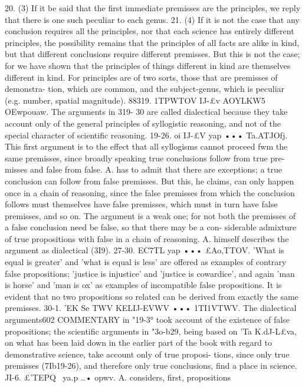 20. (3) If it be said that the first immediate premisses are
the principles, we reply that there is one such peculiar to each
genus.
21. (4) If it is not the case that any conclusion requires all the
principles, nor that each science has entirely different principles,
the possibility remains that the principles of all facts are alike
in kind, but that different conclusions require different premisses.
But this is not the case; for we have shown that the principles
of things different in kind are themselves different in kind. For
principles are of two sorts, those that are premisses of demonstra-
tion, which are common, and the subject-genus, which is peculiar
(e.g. number, spatial magnitude).
88319. 1TPWTOV IJ-£v AOYLKW5 OEwpouaw. The arguments in 319-
30 are called dialectical because they take account only of the
general principles of syllogistic reasoning, and not of the special
character of scientific reasoning.
19-26. oi IJ-£V yap ••• Ta.ATJOfj. This first argument is to the
effect that all syllogisms cannot proceed fwm the same premisses,
since broadly speaking true conclusions follow from true pre-
misses and false from false. A. has to admit that there are
exceptions; a true conclusion can follow from false premisses.
But this, he claims, can only happen once in a chain of reasoning,
since the false premisses from which the conclusion follows must
themselves have false premisses, which must in turn have false
premisses, and so on.
The argument is a weak one; for not both the premisses of
a false conclusion need be false, so that there may be a con-
siderable admixture of true propositions with false in a chain of
reasoning. A. himself describes the argument as dialectical (3I9).
27-30. EC7TL yap ••• £Ao,TTOV. 'What is equal is greater' and
'what is equal is less' are offered as examples of contrary false
propositions; 'justice is injustice' and 'justice is cowardice', and
again 'man is horse' and 'man is ox' as examples of incompatible
false propositions. It is evident that no two propositions so
related can be derived from exactly the same premisses.
30-1. 'EK Se TWV KELIJ-EVWV ••• 1TI1VTWV. The dialectical arguments602
COMMENTARY
in "19-3° took account of the existence of false propositions;
the scientific arguments in "3o-b29, being based on 'Ta K.dJ-L£va, on
what has been laid down in the earlier part of the book with
regard to demonstrative science, take account only of true proposi-
tions, since only true premisses (7Ib19-26), and therefore only
true conclusions, find a place in science.
JI-6. £'TEPQ~ ya.p ..• opwv. A. considers, first, propositions
